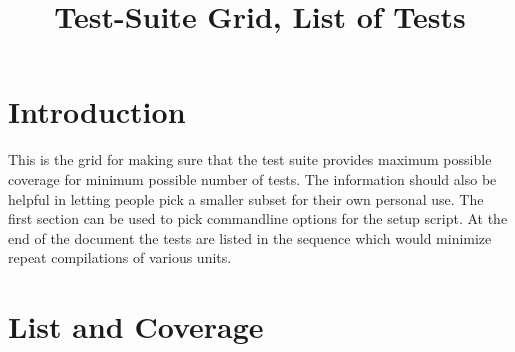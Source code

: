 \documentclass[10pt]{article}
\begin{document}
\title{Test-Suite Grid, List of Tests}

\author{}

\section*{Introduction}
This is the grid for making sure that the test suite provides maximum 
possible coverage for minimum possible number of tests. The information
should also be helpful in letting people pick a smaller subset for their 
own personal use. The first section can be used to pick commandline
options for the setup script. At the end of the document the tests are
listed in the sequence which would minimize repeat compilations of
various units.

\section*{List and Coverage}
\end{document}
